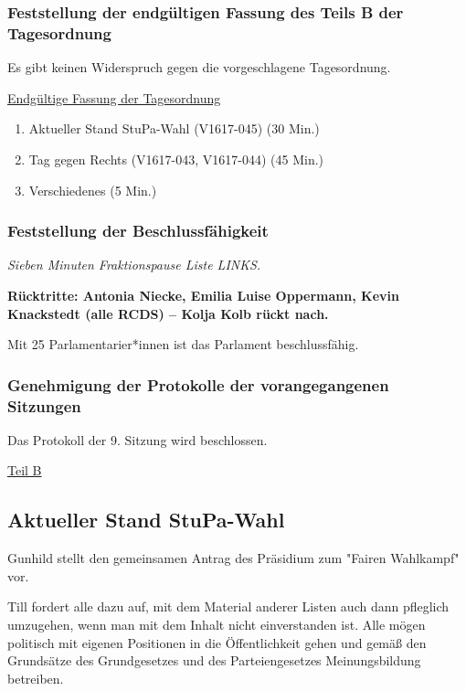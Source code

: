 \documentclass[ngerman,headheight=70pt]{scrartcl}
\begin{document}
    \subsubsection{Feststellung der endgültigen Fassung des Teils B der Tagesordnung}

    Es gibt keinen Widerspruch gegen die vorgeschlagene Tagesordnung.

    \newpage
    \underline{Endgültige Fassung der Tagesordnung}
    \begin{enumerate}[label={\textbf{Top \theenumi}},leftmargin=*]
        \item Aktueller Stand StuPa-Wahl (V1617-045) (30 Min.)
        \item Tag gegen Rechts (V1617-043, V1617-044) (45 Min.)
        \item Verschiedenes (5 Min.)
    \end{enumerate}

    \subsubsection{Feststellung der Beschlussfähigkeit}

    \textit{Sieben Minuten Fraktionspause Liste LINKS.}

    \textbf{Rücktritte: Antonia Niecke, Emilia Luise Oppermann, Kevin Knackstedt (alle
    RCDS) – Kolja Kolb rückt nach.}

    Mit 25 Parlamentarier*innen ist das Parlament beschlussfähig.


    \subsubsection{Genehmigung der Protokolle der vorangegangenen Sitzungen}

    Das Protokoll der 9. Sitzung wird beschlossen.

    \vspace{0.5cm}
    {\Large \underline{Teil B}}

    \subsection{Aktueller Stand StuPa-Wahl}

    Gunhild stellt den gemeinsamen Antrag des Präsidium zum "Fairen Wahlkampf"
    vor.

    Till fordert alle dazu auf, mit dem Material anderer Listen auch dann pfleglich
    umzugehen, wenn man mit dem Inhalt nicht einverstanden ist. Alle mögen
    politisch mit eigenen Positionen in die Öffentlichkeit gehen und gemäß den
    Grundsätze des Grundgesetzes und des Parteiengesetzes Meinungsbildung
    betreiben.
\end{document}
